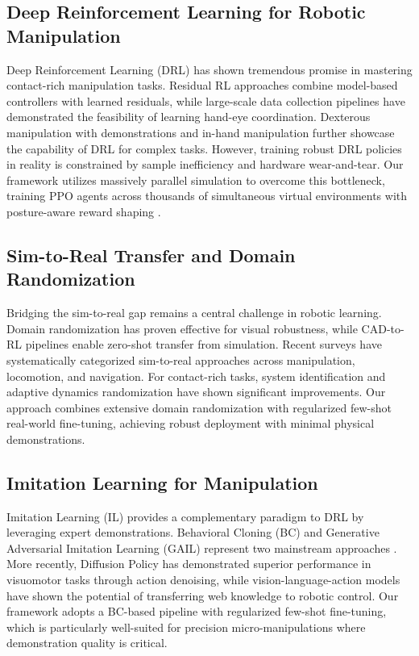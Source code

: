 \subsection{Deep Reinforcement Learning for Robotic Manipulation}
Deep Reinforcement Learning (DRL) has shown tremendous promise in mastering contact-rich manipulation tasks. Residual RL approaches \cite{johannink2019residual} combine model-based controllers with learned residuals, while large-scale data collection pipelines \cite{levine2018learning} have demonstrated the feasibility of learning hand-eye coordination. Dexterous manipulation with demonstrations \cite{rajcsy2018learning} and in-hand manipulation \cite{andrychowicz2020learning} further showcase the capability of DRL for complex tasks. However, training robust DRL policies in reality is constrained by sample inefficiency and hardware wear-and-tear. Our framework utilizes massively parallel simulation to overcome this bottleneck, training PPO agents across thousands of simultaneous virtual environments with posture-aware reward shaping \cite{ng1999policy}.

\subsection{Sim-to-Real Transfer and Domain Randomization}
Bridging the sim-to-real gap remains a central challenge in robotic learning. Domain randomization \cite{tobin2017domain} has proven effective for visual robustness, while CAD-to-RL pipelines \cite{sadeghi2017cad} enable zero-shot transfer from simulation. Recent surveys \cite{hofer2021sim2real, zhao2020sim2real} have systematically categorized sim-to-real approaches across manipulation, locomotion, and navigation. For contact-rich tasks, system identification and adaptive dynamics randomization \cite{hwangbo2019learning} have shown significant improvements. Our approach combines extensive domain randomization with regularized few-shot real-world fine-tuning, achieving robust deployment with minimal physical demonstrations.

\subsection{Imitation Learning for Manipulation}
Imitation Learning (IL) provides a complementary paradigm to DRL by leveraging expert demonstrations. Behavioral Cloning (BC) and Generative Adversarial Imitation Learning (GAIL) \cite{ho2016gail} represent two mainstream approaches \cite{osuga2018survey}. More recently, Diffusion Policy \cite{chi2023diffusion} has demonstrated superior performance in visuomotor tasks through action denoising, while vision-language-action models \cite{brohan2023rt2} have shown the potential of transferring web knowledge to robotic control. Our framework adopts a BC-based pipeline with regularized few-shot fine-tuning, which is particularly well-suited for precision micro-manipulations where demonstration quality is critical.

